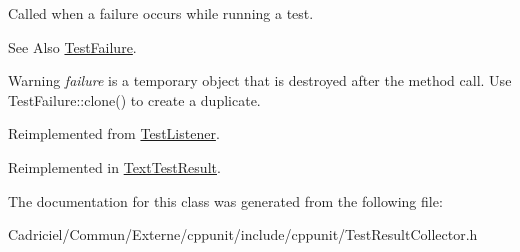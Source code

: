 Called when a failure occurs while running a test. 

\begin{DoxySeeAlso}{See Also}
\hyperlink{class_test_failure}{Test\-Failure}. 
\end{DoxySeeAlso}
\begin{DoxyWarning}{Warning}
{\itshape failure} is a temporary object that is destroyed after the method call. Use Test\-Failure\-::clone() to create a duplicate. 
\end{DoxyWarning}


Reimplemented from \hyperlink{class_test_listener_a103216a5814c907f7b752b969477e765}{Test\-Listener}.



Reimplemented in \hyperlink{class_text_test_result_a05d3b0e8e51b3430092166bbc3d17708}{Text\-Test\-Result}.



The documentation for this class was generated from the following file\-:\begin{DoxyCompactItemize}
\item 
Cadriciel/\-Commun/\-Externe/cppunit/include/cppunit/Test\-Result\-Collector.\-h\end{DoxyCompactItemize}
